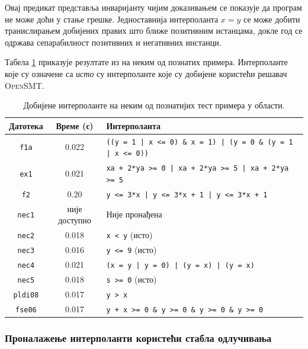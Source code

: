 \documentclass[a4paper]{article}
\begin{document}
{Овај предикат представља инваријанту чијим доказивањем се показује да програм не може доћи у стање грешке.
Једноставнија интерполанта $x = y$ се може добити транислирањем добијених правих што ближе позитивним истанцама,
докле год се одржава сепарабилност позитивних и негативних инстанци.

Табела \ref{table:interpolant_table} приказује резултате из \cite{Sharma_interpolantsas} на неким од познатих
примера. Интерполанте које су означене са \textit{исто} су интерполанте које су добијене користећи решавач \textsc{OpenSMT}.

\begin{table}[]
\centering
\caption{Добијене интерполанте на неким од познатијих тест примера у области.}
\label{table:interpolant_table}
\begin{tabular}{|c|c|l|}
\hline
\textbf{Датотека} & \textbf{Време (с)} 	& \textbf{Интерполанта}                                                     			\\ \hline
\texttt{f1a} 	& 0.022              	& \texttt{((y = 1 | x \textless= 0) \& x = 1) | (y = 0 \& (y = 1 | x \textless= 0))} 	\\ \hline
\texttt{ex1}    & 0.021              	& \texttt{xa + 2*ya >= 0 | xa + 2*ya >= 5 | xa + 2*ya >= 5}                             \\ \hline
\texttt{f2}     & 0.20               	& \texttt{y <= 3*x | y <= 3*x + 1 | y <= 3*x + 1} 										\\ \hline
\texttt{nec1}   & није доступно      	& Није пронађена                                                            			\\ \hline
\texttt{nec2}   & 0.018 				& \texttt{x < y} (исто) 																\\ \hline
\texttt{nec3}   & 0.016      			& \texttt{y <= 9} (исто)																\\ \hline
\texttt{nec4}   & 0.021      			& \texttt{(x = y | y = 0) | (y = x) | (y = x)} 											\\ \hline
\texttt{nec5}   & 0.018      			& \texttt{s >= 0} (исто) 																\\ \hline
\texttt{pldi08} & 0.017      			& \texttt{y > x}																		\\ \hline
\texttt{fse06}  & 0.017      			& \texttt{y + x >= 0 \& y >= 0 \& y >= 0 \& y >= 0}										\\ \hline
\end{tabular}
\end{table}

\subsubsection{Проналажење интерполанти користећи стабла одлучивања}
\label{sssec:interpolant_dt}

}
\end{document}
